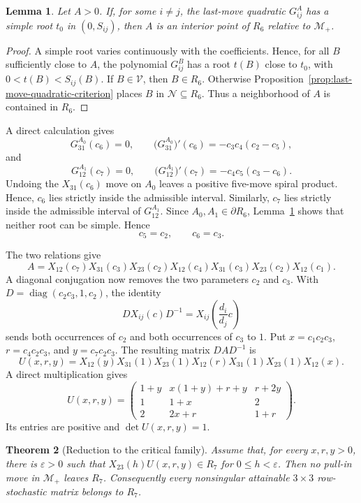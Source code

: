\documentclass[11pt,onecolumn]{amsart}
\theoremstyle{plain}
\newtheorem{theorem}{Theorem}[section]
\newtheorem{lemma}[theorem]{Lemma}
\theoremstyle{definition}
\theoremstyle{remark}
\newcommand{\V}{\mathcal V}
\newcommand{\NH}{\mathcal N}
\begin{document}
\begin{lemma}
\label{lem:simple-root-certificate-open}
Let $A>0$. If, for some $i\neq j$, the last-move quadratic
$G_{ij}^A$ has a simple root $t_0$ in $(0,S_{ij})$, then $A$ is an
interior point of
$R_6$ relative to $\mathcal M_+$.
\end{lemma}

\begin{proof}
A simple root varies continuously with the coefficients. Hence, for
all $B$ sufficiently close to $A$, the polynomial $G_{ij}^B$ has a
root $t(B)$ close to $t_0$, with $0<t(B)<S_{ij}(B)$. If $B\in\V$, then
$B\in R_6$. Otherwise
Proposition~\ref{prop:last-move-quadratic-criterion} places $B$ in
$\NH\subseteq R_6$. Thus a neighborhood of $A$ is contained in $R_6$.
\end{proof}

A direct calculation gives
\[
G_{31}^{A_0}(c_6)=0,
\qquad
\bigl(G_{31}^{A_0}\bigr)'(c_6)=-c_3c_4(c_2-c_5),
\]
and
\[
G_{12}^{A_1}(c_7)=0,
\qquad
\bigl(G_{12}^{A_1}\bigr)'(c_7)=-c_4c_5(c_3-c_6).
\]
Undoing the $X_{31}(c_6)$ move on $A_0$ leaves a positive five-move spiral product.
Hence, $c_6$ lies strictly inside the admissible interval. Similarly, $c_7$
lies strictly inside the admissible interval of $G_{12}^{A_1}$. Since
$A_0,A_1\in\partial R_6$, Lemma~\ref{lem:simple-root-certificate-open}
shows that neither root can be simple. Hence
\[
c_5=c_2,
\qquad
c_6=c_3.
\]


The two relations give
\[
A=X_{12}(c_7)X_{31}(c_3)X_{23}(c_2)
  X_{12}(c_4)X_{31}(c_3)X_{23}(c_2)X_{12}(c_1).
\]
A diagonal conjugation now removes the two parameters $c_2$ and $c_3$.
With $D=\operatorname{diag}(c_2c_3,1,c_2)$, the identity
\[
DX_{ij}(c)D^{-1}=X_{ij}\left(\frac{d_i}{d_j}c\right)
\]
sends both occurrences of $c_2$ and both occurrences of $c_3$ to $1$.
Put $x=c_1c_2c_3$, $r=c_4c_2c_3$, and $y=c_7c_2c_3$. The resulting
matrix $DAD^{-1}$ is
\[
U(x,r,y)
=X_{12}(y)X_{31}(1)X_{23}(1)X_{12}(r)X_{31}(1)X_{23}(1)X_{12}(x).
\]
A direct multiplication gives
\begin{equation}\label{eq:critical-family}
U(x,r,y)=
\begin{pmatrix}
1+y & x(1+y)+r+y & r+2y\\
1 & 1+x & 2\\
2 & 2x+r & 1+r
\end{pmatrix}.
\end{equation}
Its entries are positive and $\det U(x,r,y)=1$.

\begin{theorem}[Reduction to the critical family]
\label{thm:critical-family-reduction}
Assume that, for every $x,r,y>0$, there is $\varepsilon>0$ such that
$X_{23}(h)U(x,r,y)\in R_7$ for $0\leq h<\varepsilon$.  Then no pull-in
move  in $\mathcal M_+$ leaves $R_7$. Consequently
every nonsingular attainable $3\times3$ row-stochastic matrix belongs
to $R_7$.
\end{theorem}
\end{document}
